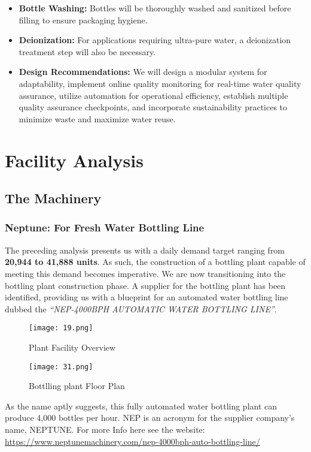 \documentclass{article}
\begin{document}
\begin{itemize}
\item \textbf{Bottle Washing:} Bottles will be thoroughly washed and sanitized before filling to ensure packaging hygiene.

\item \textbf{Deionization:} For applications requiring ultra-pure water, a deionization treatment step will also be necessary.

\item \textbf{Design Recommendations:} We will design a modular system for adaptability, implement online quality monitoring for real-time water quality assurance, utilize automation for operational efficiency, establish multiple quality assurance checkpoints, and incorporate sustainability practices to minimize waste and maximize water reuse.

\end{itemize}
\section{Facility Analysis}
\subsection{The Machinery}
\subsubsection{Neptune: For Fresh Water Bottling Line}
The preceding analysis presents us with a daily demand target ranging from \textbf{20,944 to 41,888 units}. As such, the construction of a bottling plant capable of meeting this demand becomes imperative. 
We are now transitioning into the bottling plant construction phase. 
A supplier for the bottling plant has been identified, providing us with a blueprint for an automated water bottling line dubbed the \textit{``NEP-4000BPH AUTOMATIC WATER BOTTLING LINE''}. 

\begin{figure}[H]
    \centering
    \texttt{[image: 19.png]}
    \caption{Plant Facility Overview}
    \label{fig:plant}
\end{figure}
\begin{figure}[H]
    \centering
    \texttt{[image: 31.png]}
    \caption{Bottlling plant Floor Plan}
    \label{fig:plant}
\end{figure}
As the name aptly suggests, this fully automated water bottling plant can produce 4,000 bottles per hour. NEP is an acronym for the supplier company's name, NEPTUNE. For more Info here see the website: \url{https://www.neptunemachinery.com/nep-4000bph-auto-bottling-line/}\par
\end{document}
